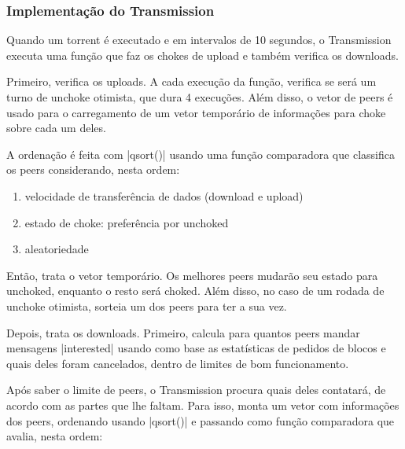 \subsubsection*{Implementação do Transmission}

Quando um \gls*{torrent} é executado e em intervalos de 10 segundos, o Transmission
executa uma função que faz os chokes de upload e também verifica os downloads.


Primeiro, verifica os uploads. A cada execução da função, verifica se será um turno de
unchoke otimista, que dura 4 execuções. Além disso, o vetor de \glspl*{peer} é usado
para o carregamento de um vetor temporário de informações para choke sobre cada um
deles.


A ordenação é feita com \sverb|qsort()| usando uma função comparadora que classifica os
\glspl*{peer} considerando, nesta ordem:

\begin{enumerate}
    \item velocidade de transferência de dados (download e upload)
    \item estado de choke: preferência por unchoked
    \item aleatoriedade
\end{enumerate}


Então, trata o vetor temporário. Os melhores \glspl*{peer} mudarão seu estado para
unchoked, enquanto o resto será choked. Além disso, no caso de um rodada de unchoke
otimista, sorteia um dos \glspl*{peer} para ter a sua vez.


Depois, trata os downloads. Primeiro, calcula para quantos \glspl*{peer} mandar
mensagens \bverb|interested| usando como base as estatísticas de pedidos de blocos e
quais deles foram cancelados, dentro de limites de bom funcionamento.


Após saber o limite de \glspl*{peer}, o Transmission procura quais deles contatará, de
acordo com as partes que lhe faltam. Para isso, monta um vetor com informações dos
\glspl*{peer}, ordenando usando \sverb|qsort()| e passando como função comparadora que
avalia, nesta ordem:

